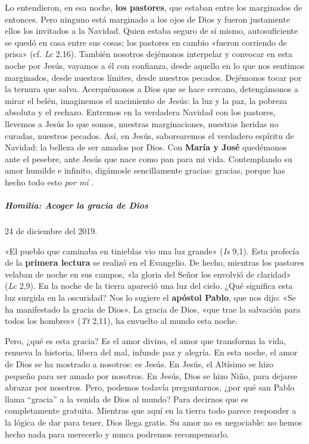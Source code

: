 \documentclass[]{article}
\let\oldsubparagraph\subparagraph
\renewcommand{\subparagraph}[1]{\oldsubparagraph{#1}\mbox{}}
\begin{document}
Lo entendieron, en esa noche, \textbf{los pastores}, que estaban entre
los marginados de entonces. Pero ninguno está marginado a los ojos de
Dios y fueron justamente ellos los invitados a la Navidad. Quien estaba
seguro de sí mismo, autosuficiente se quedó en casa entre sus cosas; los
pastores en cambio «fueron corriendo de prisa» (cf. \emph{Lc} 2,16).
También nosotros dejémonos interpelar y convocar en esta noche por
Jesús, vayamos a él con confianza, desde aquello en lo que nos sentimos
marginados, desde nuestros límites, desde nuestros pecados. Dejémonos
tocar por la ternura que salva. Acerquémonos a Dios que se hace cercano,
detengámonos a mirar el belén, imaginemos el nacimiento de Jesús: la luz
y la paz, la pobreza absoluta y el rechazo. Entremos en la verdadera
Navidad con los pastores, llevemos a Jesús lo que somos, nuestras
marginaciones, nuestras heridas no curadas, nuestros pecados. Así, en
Jesús, saborearemos el verdadero espíritu de Navidad: la belleza de ser
amados por Dios. Con \textbf{María y José} quedémonos ante el pesebre,
ante Jesús que nace como pan para mi vida. Contemplando su amor humilde
e infinito, digámosle sencillamente gracias: gracias, porque has hecho
todo esto \emph{por mí} .

\subparagraph{Homilía: Acoger la gracia de
Dios}\label{homiluxeda-acoger-la-gracia-de-dios}

24 de diciembre del 2019.

«El pueblo que caminaba en tinieblas vio una luz grande» (\emph{Is}
9,1). Esta profecía de la \textbf{primera lectura} se realizó en el
Evangelio. De hecho, mientras los pastores velaban de noche en sus
campos, «la gloria del Señor los envolvió de claridad» (\emph{Lc} 2,9).
En la noche de la tierra apareció una luz del cielo. ¿Qué significa esta
luz surgida en la oscuridad? Nos lo sugiere el \textbf{apóstol Pablo},
que nos dijo: «Se ha manifestado la gracia de Dios». La gracia de Dios,
«que trae la salvación para todos los hombres» (\emph{Tt} 2,11), ha
envuelto al mundo esta noche.

Pero, ¿qué es esta gracia? Es el amor divino, el amor que transforma la
vida, renueva la historia, libera del mal, infunde paz y alegría. En
esta noche, el amor de Dios se ha mostrado a nosotros: es Jesús. En
Jesús, el Altísimo se hizo pequeño para ser amado por nosotros. En
Jesús, Dios se hizo Niño, para dejarse abrazar por nosotros. Pero,
podemos todavía preguntarnos, ¿por qué san Pablo llama ``gracia'' a la
venida de Dios al mundo? Para decirnos que es completamente gratuita.
Mientras que aquí en la tierra todo parece responder a la lógica de dar
para tener, Dios llega gratis. Su amor no es negociable: no hemos hecho
nada para merecerlo y nunca podremos recompensarlo.
\end{document}
